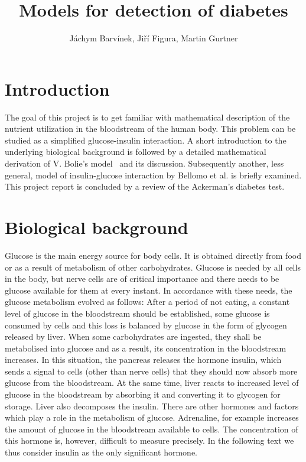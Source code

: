 \documentclass{article}
\begin{document}
\title{Models for detection of diabetes}
\author{J\'achym Barv\'inek, Ji\v r\'i Figura, Martin Gurtner}

\maketitle

\section{Introduction}

The goal of this project is to get familiar with mathematical description of the nutrient utilization in the bloodstream of the human body. This problem can be studied as a simplified glucose-insulin interaction.
A short introduction to the underlying biological background is followed by a detailed mathematical derivation of V. Bolie's model~\cite{bolie1961coefficients} and its discussion.
Subsequently another, less general, model of insulin-glucose interaction by Bellomo et al. is briefly examined.
This project report is concluded by a review of the Ackerman's diabetes test. 

\section{Biological background}

Glucose is the main energy source for body cells. It is obtained directly from food or as a result of metabolism of other carbohydrates. Glucose is needed by all cells in the body, but nerve cells are of critical importance and there needs
to be glucose available for them at every instant. In accordance with these needs, the glucose
metabolism evolved as follows:
After a period of not eating, a constant level of glucose in the bloodstream should be established,
some glucose is consumed by cells and this loss is balanced by glucose in the form of glycogen
released by liver. When some carbohydrates are ingested, they shall be metabolised into glucose
and as a result, its concentration in the bloodstream increases. In this situation, the pancreas
releases the hormone insulin, which sends a signal to cells (other than nerve cells) that they should
now absorb more glucose from the bloodstream. At the same time, liver reacts to increased level of 
glucose in the bloodstream by absorbing it and converting it to glycogen for storage. Liver also 
decomposes the insulin. There are other hormones and factors which play a role in the metabolism
of glucose. Adrenaline, for example increases the amount of glucose in the bloodstream available
to cells. The concentration of this hormone is, however, difficult to measure precisely.
In the following text we thus consider insulin as the only significant hormone.
\end{document}
